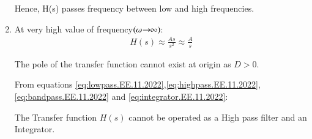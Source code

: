 \documentclass[journal,12pt,twocolumn]{IEEEtran}
\theoremstyle{remark}
\begin{document}
\begin{enumerate}[label=(\roman*)]
\begin{tikzpicture}
\end{tikzpicture}
Hence, H(s) passes frequency between low and high frequencies.
\item  At very high value of frequency$(\omega\mkern-4mu \rightarrow\mkern-6mu\infty)$:
\begin{align}
    H(s) \approx \frac{As}{s^2} \approx \frac{A}{s}\label{eq:integrator.EE.11.2022}
\end{align}

The pole of the transfer function cannot exist at origin as $D > 0$.

From equations \eqref{eq:lowpass.EE.11.2022},\eqref{eq:highpass.EE.11.2022},\eqref{eq:bandpass.EE.11.2022} and \eqref{eq:integrator.EE.11.2022}:

The Transfer function $H(s)$ cannot be operated as a High pass filter and an Integrator.
\end{enumerate}

% 
\end{document}
